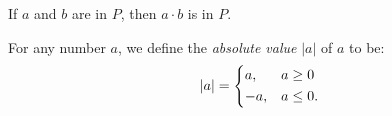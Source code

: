 \begin{theorem}
If $a$ and $b$ are in $P$, then $a \cdot b$ is in $P$.
\cite[pg.~9]{spivak}
\end{theorem}

\begin{defn}
    For any number $a$, we define the \emph{absolute value}
    $|a|$ of $a$ to be:\cite[pg.~11]{spivak}
    \begin{equation}
        |a| = \begin{dcases}
            a, &a \geq 0\\
            -a, & a \leq 0.
        \end{dcases}
    \end{equation}
\end{defn}
